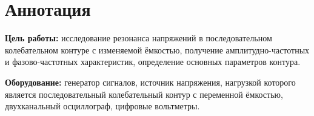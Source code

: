 \section{Аннотация}
\textbf{Цель работы:} исследование резонанса напряжений в последовательном колебательном контуре с изменяемой ёмкостью, получение амплитудно-частотных и фазово-частотных характеристик, определение основных параметров контура.

\textbf{Оборудование:} генератор сигналов, источник напряжения, нагрузкой которого является последовательный колебательный контур с переменной ёмкостью, двухканальный осциллограф, цифровые вольтметры.
